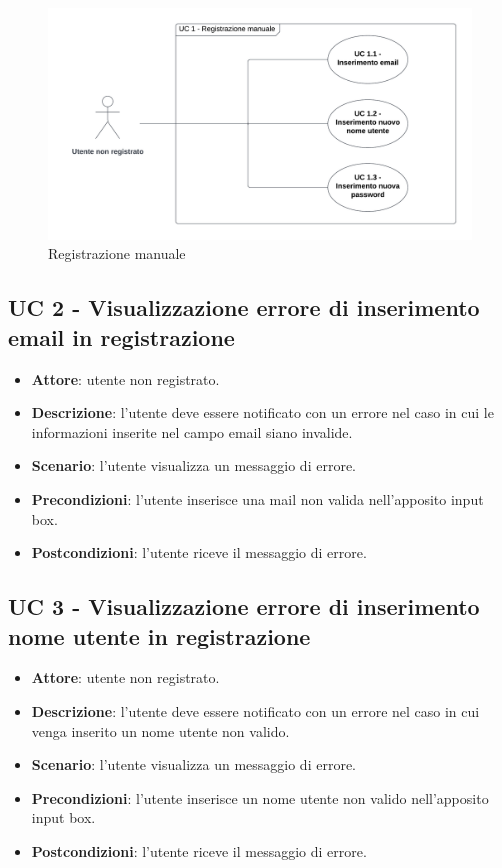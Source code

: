 \begin{figure}[!h]
    \includegraphics[width=15cm]{sezioni/Images/UC1_s.png}
    \centering
    \caption{Registrazione manuale}
\end{figure}

\subsection{UC 2 - Visualizzazione errore di inserimento email in registrazione}
\begin{itemize}
    \item \textbf{Attore}: utente non registrato.
    \item \textbf{Descrizione}: l’utente deve essere notificato con un errore nel caso in cui le informazioni inserite nel campo email siano invalide.
    \item \textbf{Scenario}: l’utente visualizza un messaggio di errore.
    \item \textbf{Precondizioni}: l’utente inserisce una mail non valida nell'apposito input box.
    \item \textbf{Postcondizioni}: l’utente riceve il messaggio di errore.
\end{itemize}

\subsection{UC 3 - Visualizzazione errore di inserimento nome utente in registrazione}
\begin{itemize}
    \item \textbf{Attore}: utente non registrato.
    \item \textbf{Descrizione}: l’utente deve essere notificato con un errore nel caso in cui venga inserito un nome utente non valido.
    \item \textbf{Scenario}: l’utente visualizza un messaggio di errore.
    \item \textbf{Precondizioni}: l’utente inserisce un nome utente non valido nell'apposito input box.
    \item \textbf{Postcondizioni}: l’utente riceve il messaggio di errore.
\end{itemize}

